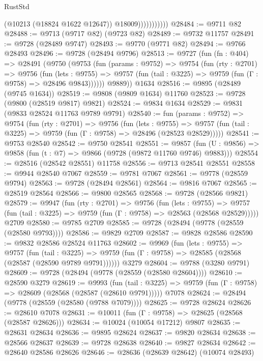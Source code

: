 \begin{lexlean}{RustStd}
\begin{coremodule}
                          (@10213 (@18824 @1622 @12647))
                          @18009)))))))))))
@28484 := @9711 @82
@28488 := @9713 (@9717 @82) (@9723 @82)
@28489 := @9732 @11757
@28491 := @9728 (@28489 @9747)
@28493 := @9770 (@9771 @82)
@28494 := @9766 @28493
@28496 := @9728 (@28494 @9796)
@28513 := @9727
    (fun (fn : @404) =>
    @28491
      (@9750
        (@9753
          (fun (params : @9752) =>
          @9754
            (fun (rty : @2701) =>
            @9756
              (fun (lets : @9755) =>
              @9757 (fun (tail : @3225) => @9759 (fun (Γ : @9758) => @28496 @9843))))))
        @9889))
    @1634
@28516 := @9895 (@28489 (@9745 @1634))
@28519 := @9808 (@9809 @1634) @11760
@28523 := @9728 (@9800 (@28519 @9817) @9821)
@28524 := @9834 @1634
@28529 := @9831 (@9833 @28524 @11763 @9789 @9791)
@28540 := fun (params : @9752) =>
  @9754
    (fun (rty : @2701) =>
    @9756
      (fun (lets : @9755) =>
      @9757 (fun (tail : @3225) => @9759 (fun (Γ : @9758) => @28496 (@28523 @28529)))))
@28541 := @9753 @28540
@28542 := @9750 @28541
@28551 := @9857
    (fun (U : @9856) => @9858 (fun (t : @7) => @9866 (@9728 (@9872 @11760 @9746) @9883)))
@28554 := @28516 (@28542 @28551) @11758
@28556 := @9713 @28541 @28551
@28558 := @9944 @28540 @7067
@28559 := @9781 @7067
@28561 := @9778 (@28559 @9794)
@28563 := @9728 (@28494 @28561)
@28564 := @9816 @7067
@28565 := @28519 @28564
@28566 := @9800 @28565
@28568 := @9728 (@28566 @9821)
@28579 := @9947
    (fun (rty : @2701) =>
    @9756
      (fun (lets : @9755) =>
      @9757 (fun (tail : @3225) => @9759 (fun (Γ : @9758) => @28563 (@28568 @28529)))))
    @2709
@28580 := @9785 @2709
@28585 := @9728 (@28494 (@9778 (@28559 (@28580 @9793))))
@28586 := @9829 @2709
@28587 := @9828 @28586
@28590 := @9832 @28586 @28524 @11763
@28602 := @9969
    (fun (lets : @9755) =>
    @9757
      (fun (tail : @3225) =>
      @9759 (fun (Γ : @9758) => @28585 (@28568 (@28587 (@28590 @9789 @9791))))))
    @3279
@28604 := @9788 (@3280 @9791)
@28609 := @9728 (@28494 (@9778 (@28559 (@28580 @28604))))
@28610 := @28590 @3279
@28619 := @9993
    (fun (tail : @3225) => @9759 (fun (Γ : @9758) => @28609 (@28568 (@28587 (@28610 @9791)))))
    @7078
@28624 := @28494 (@9778 (@28559 (@28580 (@9788 @7079))))
@28625 := @9728 @28624
@28626 := @28610 @7078
@28631 := @10011 (fun (Γ : @9758) => @28625 (@28568 (@28587 @28626)))
@28634 := @10024 (@10054 @17212) @9807
@28635 := @28631 @28634
@28636 := @9895 @28624
@28637 := @9820 @28634
@28638 := @28566 @28637
@28639 := @9728 @28638
@28640 := @9827 @28634
@28642 := @28640 @28586 @28626
@28646 := @28636 (@28639 @28642) (@10074 @28493)

\end{coremodule}
\end{lexlean}
